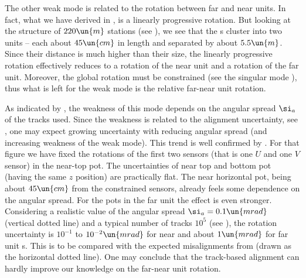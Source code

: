 
The other weak mode is related to the rotation between far and near units. In fact, what we have derived in , is a linearly progressive rotation. But looking at the structure of $220\un{m}$ stations (see ), we see that the s cluster into two units -- each about $45\un{cm}$ in length and separated by about $5.5\un{m}$. Since their distance is much higher than their size, the linearly progressive rotation effectively reduces to a rotation of the near unit and a rotation of the far unit. Moreover, the global rotation must be constrained (see the singular mode ), thus what is left for the weak mode is the relative far-near unit rotation.

As indicated by , the weakness of this mode depends on the angular spread $\si_a$ of the tracks used. Since the weakness is related to the alignment uncertainty, see , one may expect growing uncertainty with reducing angular spread (and increasing weakness of the weak mode). This trend is well confirmed by . For that figure we have fixed the rotations of the first two sensors (that is one $U$ and one $V$ sensor) in the near-top pot. The uncertainties of near top and bottom pot (having the same $z$ position) are practically flat. The near horizontal pot, being about $45\un{cm}$ from the constrained sensors, already feels some dependence on the angular spread. For the pots in the far unit the effect is even stronger. Considering a realistic value of the angular spread $\si_a =  0.1\un{mrad}$ (vertical dotted line) and a typical number of tracks $10^5$ (see ), the rotation uncertainty is $10^{-1}$ to $10^{-2}\un{mrad}$ for near and about $1\un{mrad}$ for far unit s. This is to be compared with the expected misalignments from  (drawn as the horizontal dotted line). One may conclude that the track-based alignment can hardly improve our knowledge on the far-near unit rotation.

